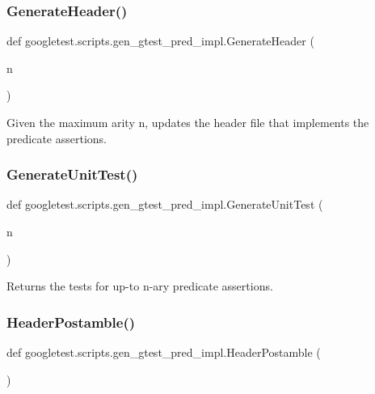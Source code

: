 \subsubsection{\texorpdfstring{GenerateHeader()}{GenerateHeader()}}
{\footnotesize\ttfamily def googletest.\+scripts.\+gen\+\_\+gtest\+\_\+pred\+\_\+impl.\+Generate\+Header (\begin{DoxyParamCaption}\item[{}]{n }\end{DoxyParamCaption})}

\begin{DoxyVerb}Given the maximum arity n, updates the header file that implements
the predicate assertions.
\end{DoxyVerb}
 \mbox{\label{namespacegoogletest_1_1scripts_1_1gen__gtest__pred__impl_a67e3a1a91ac339842cc74d50f4692891}} 
\subsubsection{\texorpdfstring{GenerateUnitTest()}{GenerateUnitTest()}}
{\footnotesize\ttfamily def googletest.\+scripts.\+gen\+\_\+gtest\+\_\+pred\+\_\+impl.\+Generate\+Unit\+Test (\begin{DoxyParamCaption}\item[{}]{n }\end{DoxyParamCaption})}

\begin{DoxyVerb}Returns the tests for up-to n-ary predicate assertions.\end{DoxyVerb}
 \mbox{\label{namespacegoogletest_1_1scripts_1_1gen__gtest__pred__impl_a5ced94dbdb35505facb1eb8f9b38dc43}} 
\subsubsection{\texorpdfstring{HeaderPostamble()}{HeaderPostamble()}}
{\footnotesize\ttfamily def googletest.\+scripts.\+gen\+\_\+gtest\+\_\+pred\+\_\+impl.\+Header\+Postamble (\begin{DoxyParamCaption}{ }\end{DoxyParamCaption})}

